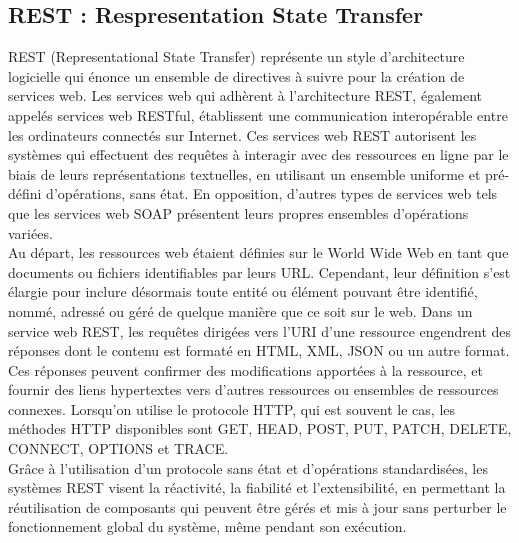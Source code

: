 \documentclass[a4paper, 12pt, french]{article}
\begin{document}
		\subsection{REST : Respresentation State Transfer}%
			REST (Representational State Transfer) représente un style d'architecture logicielle qui énonce un ensemble de directives à suivre pour la création de services web. Les services web qui adhèrent à l'architecture REST, également appelés services web RESTful, établissent une communication interopérable entre les ordinateurs connectés sur Internet. Ces services web REST autorisent les systèmes qui effectuent des requêtes à interagir avec des ressources en ligne par le biais de leurs représentations textuelles, en utilisant un ensemble uniforme et pré-défini d'opérations, sans état. En opposition, d'autres types de services web tels que les services web SOAP présentent leurs propres ensembles d'opérations variées.\\

			Au départ, les ressources web étaient définies sur le World Wide Web en tant que documents ou fichiers identifiables par leurs URL. Cependant, leur définition s'est élargie pour inclure désormais toute entité ou élément pouvant être identifié, nommé, adressé ou géré de quelque manière que ce soit sur le web. Dans un service web REST, les requêtes dirigées vers l'URI d'une ressource engendrent des réponses dont le contenu est formaté en HTML, XML, JSON ou un autre format. Ces réponses peuvent confirmer des modifications apportées à la ressource, et fournir des liens hypertextes vers d'autres ressources ou ensembles de ressources connexes. Lorsqu'on utilise le protocole HTTP, qui est souvent le cas, les méthodes HTTP disponibles sont GET, HEAD, POST, PUT, PATCH, DELETE, CONNECT, OPTIONS et TRACE.\\

			Grâce à l'utilisation d'un protocole sans état et d'opérations standardisées, les systèmes REST visent la réactivité, la fiabilité et l'extensibilité, en permettant la réutilisation de composants qui peuvent être gérés et mis à jour sans perturber le fonctionnement global du système, même pendant son exécution.
	

\end{document}
